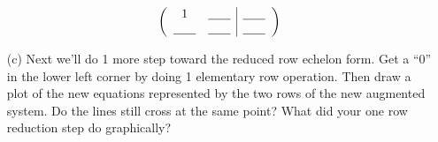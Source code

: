 \begin{problem}
\begin{enumerate}
            \begin{minipage}{0.3\columnwidth}
            \[ \left( \begin{array}{cc|c} 1 &
                        \underline{\hspace{0.25in}} &  \underline{\hspace{0.25in}} \\  \underline{\hspace{0.25in}} &
                        \underline{\hspace{0.25in}} &  \underline{\hspace{0.25in}}
                \end{array} \right) \]
            \end{minipage}
            \begin{minipage}{0.6\columnwidth}
            \begin{center}
            \end{center}
            \end{minipage}
        \item[(c)] Next we'll do 1 more step toward the reduced row echelon form.  Get a
            ``0''
            in the lower left corner by doing 1 elementary row operation. Then
            draw a plot of the new equations represented by the two rows of the new augmented
            system.  Do the lines still cross at the same point? What did your one row
            reduction step do graphically?


\end{enumerate}
\end{problem}
